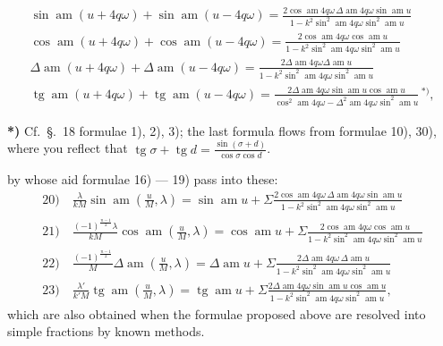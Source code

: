 \documentclass{article}
\begin{document}
\[
\begin{gathered}
\sin\operatorname{am}(u+4q\omega)+\sin\operatorname{am}(u-4q\omega)=\frac{2\cos\operatorname{am}4q\omega\,\Delta\operatorname{am}4q\omega\sin\operatorname{am}u}{1-k^{2}\sin^{2}\operatorname{am}4q\omega\sin^{2}\operatorname{am}u}\\[1.5ex]
\cos\operatorname{am}(u+4q\omega)+\cos\operatorname{am}(u-4q\omega)=\frac{2\cos\operatorname{am}4q\omega\cos\operatorname{am}u}{1-k^{2}\sin^{2}\operatorname{am}4q\omega\sin^{2}\operatorname{am}u}\\[1.5ex]
\Delta\operatorname{am}(u+4q\omega)+\Delta\operatorname{am}(u-4q\omega)=\frac{2\Delta\operatorname{am}4q\omega\Delta\operatorname{am}u}{1-k^{2}\sin^{2}\operatorname{am}4q\omega\sin^{2}\operatorname{am}u}\\[1.5ex]
\operatorname{tg}\operatorname{am}(u+4q\omega)+\operatorname{tg}\operatorname{am}(u-4q\omega)=\frac{2\Delta\operatorname{am}4q\omega\sin\operatorname{am}u\cos\operatorname{am}u}{\cos^{2}\operatorname{am}4q\omega-\Delta^{2}\operatorname{am}4q\omega\sin^{2}\operatorname{am}u}\,{}^{*)},
\end{gathered}
\]

\textbf{*)} Cf.\ §.\ 18 formulae 1), 2), 3); the last formula flows from formulae 10), 30), where you reflect that $\operatorname{tg}\sigma+\operatorname{tg}d=\frac{\sin(\sigma+d)}{\cos\sigma\cos d}$.

by whose aid formulae 16) --- 19) pass into these:
\[
\begin{gathered}
\text{20)}\quad\frac{\lambda}{kM}\sin\operatorname{am}\left(\frac{u}{M},\lambda\right)=\sin\operatorname{am}u+\Sigma\frac{2\cos\operatorname{am}4q\omega\,\Delta\operatorname{am}4q\omega\sin\operatorname{am}u}{1-k^{2}\sin^{2}\operatorname{am}4q\omega\sin^{2}\operatorname{am}u}\\[1.5ex]
\text{21)}\quad\frac{(-1)^{\frac{n-1}{2}}\lambda}{kM}\cos\operatorname{am}\left(\frac{u}{M},\lambda\right)=\cos\operatorname{am}u+\Sigma\frac{2\cos\operatorname{am}4q\omega\cos\operatorname{am}u}{1-k^{2}\sin^{2}\operatorname{am}4q\omega\sin^{2}\operatorname{am}u}\\[1.5ex]
\text{22)}\quad\frac{(-1)^{\frac{n-1}{2}}}{M}\Delta\operatorname{am}\left(\frac{u}{M},\lambda\right)=\Delta\operatorname{am}u+\Sigma\frac{2\Delta\operatorname{am}4q\omega\,\Delta\operatorname{am}u}{1-k^{2}\sin^{2}\operatorname{am}4q\omega\sin^{2}\operatorname{am}u}\\[1.5ex]
\text{23)}\quad\frac{\lambda'}{k'M}\operatorname{tg}\operatorname{am}\left(\frac{u}{M},\lambda\right)=\operatorname{tg}\operatorname{am}u+\Sigma\frac{2\Delta\operatorname{am}4q\omega\sin\operatorname{am}u\cos\operatorname{am}u}{1-k^{2}\sin^{2}\operatorname{am}4q\omega\sin^{2}\operatorname{am}u},
\end{gathered}
\]
which are also obtained when the formulae proposed above are resolved into simple fractions by known methods.
\end{document}
